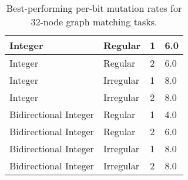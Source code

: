 \begin{table}[!htbp]
\begin{tabular}{l|l|l|l}
Integer               & Regular                   & 1                      & 6.0                                            \\ \hline
Integer               & Regular                   & 2                      & 6.0                                            \\ \hline
Integer               & Irregular                 & 1                      & 8.0                                            \\ \hline
Integer               & Irregular                 & 2                      & 8.0                                            \\ \hline
Bidirectional Integer & Regular                   & 1                      & 4.0                                            \\ \hline
Bidirectional Integer & Regular                   & 2                      & 6.0                                            \\ \hline
Bidirectional Integer & Irregular                 & 1                      & 8.0                                            \\ \hline
Bidirectional Integer & Irregular                 & 2                      & 8.0
\end{tabular}

\caption{
Best-performing per-bit mutation rates for 32-node graph matching tasks.
}
\label{tab:evo_graph_mut}

\end{table}
